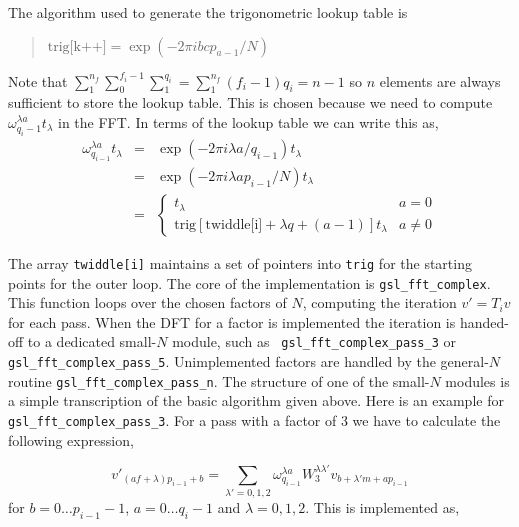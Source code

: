 \documentclass[fleqn,12pt]{article}
\newenvironment{algorithm}{\begin{quote} %
\begin{algorithmic}\samepage}{\end{algorithmic} %
\end{quote}}
\begin{document}
The algorithm used to generate the trigonometric lookup table is
%
\begin{algorithm}
\STATE $\mbox{trig[k++]} = \exp(- 2\pi i b c p_{a-1}/N)$
\ENDFOR
\ENDFOR
\ENDFOR
\end{algorithm}
%
Note that $\sum_{1}^{n_f} \sum_{0}^{f_i-1} \sum_{1}^{q_i} =
\sum_{1}^{n_f} (f_i-1)q_i = n - 1$ so $n$ elements are always
sufficient to store the lookup table. This is chosen because we need
to compute $\omega_{q_i-1}^{\lambda a} t_\lambda$ in
the FFT. In terms of the lookup table we can write this as,
%
\begin{eqnarray}
\omega_{q_{i-1}}^{\lambda a} t_\lambda 
&=&  \exp(-2\pi i \lambda a/q_{i-1}) t_\lambda \\
&=&  \exp(-2\pi i \lambda a p_{i-1}/N) t_\lambda \\
&=& \left\{
    \begin{array}{ll}
    t_\lambda & a=0 \\
    \mbox{trig}[\mbox{twiddle[i]}+\lambda q+(a-1)] t_\lambda & a\not=0
\end{array}
\right.
\end{eqnarray}
%
\begin{sloppypar}
\noindent 
The array {\tt twiddle[i]} maintains a set of pointers into {\tt trig}
for the starting points for the outer loop.  The core of the
implementation is {\tt gsl\_fft\_complex}. This function loops over
the chosen factors of $N$, computing the iteration $v'=T_i v$ for each
pass. When the DFT for a factor is implemented the iteration is
handed-off to a dedicated small-$N$ module, such as {\tt
gsl\_fft\_complex\_pass\_3} or {\tt
gsl\_fft\_complex\_pass\_5}.  Unimplemented factors are handled
by the general-$N$ routine {\tt gsl\_fft\_complex\_pass\_n}. The
structure of one of the small-$N$ modules is a simple transcription of
the basic algorithm given above.  Here is an example for {\tt
gsl\_fft\_complex\_pass\_3}. For a pass with a factor of 3 we have to
calculate the following expression,
\end{sloppypar}%
\begin{equation}
v'_{(a f + \lambda) p_{i-1} + b} 
= 
\sum_{\lambda' = 0,1,2} 
\omega^{\lambda a}_{q_{i-1}} W^{\lambda \lambda'}_{3} 
v_{b + \lambda' m + a p_{i-1}}
\end{equation}
%
for $b = 0 \dots p_{i-1} - 1$, $a = 0 \dots q_{i} - 1$ and $\lambda =
0, 1, 2$.  This is implemented as,
%
\end{document}
